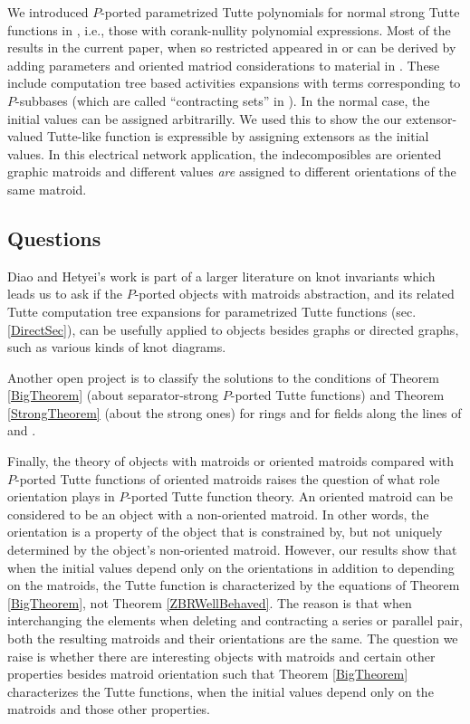\documentclass[12pt,leqno]{amsart}
\theoremstyle{remark}
\begin{document}
We introduced $P$-ported parametrized Tutte polynomials
for normal strong Tutte functions
in \cite{TutteEx}, i.e., 
those with
corank-nullity polynomial expressions.
Most of the results in the current paper, when so restricted
appeared in \cite{TutteEx}
or can be derived by adding parameters and oriented matriod considerations
to material in \cite{sdcPorted}.  
These include computation tree\cite{GordonMcMachonGreedoid} based activities 
expansions 
with terms corresponding to $P$-subbases (which are called
``contracting sets'' in \cite{RelTuttePoly}).
In the normal case, the initial values can be assigned arbitrarilly.
We used this to show the our extensor-valued Tutte-like function 
\cite{sdcPorted} is expressible
by assigning extensors as the initial values.  In this
electrical network application, the indecomposibles are oriented 
graphic matroids
and different values \emph{are} assigned to different orientations of
the same matroid.  

\subsection{Questions}
\label{Qsubsection}
Diao and Hetyei's work \cite{RelTuttePoly} is part of a
larger literature on knot invariants which
leads us to ask if the $P$-ported objects with matroids abstraction, 
and its related Tutte computation tree expansions for parametrized
Tutte functions (sec. \ref{DirectSec}), can be usefully
applied to objects besides graphs or directed graphs, such
as various kinds of knot diagrams.

Another open project is to classify the solutions to
the conditions of Theorem \ref{BigTheorem} (about separator-strong
$P$-ported Tutte functions) and 
Theorem  \ref{StrongTheorem} (about the strong ones) for rings and
for fields along the lines of 
\cite{MR93a:05047} and \cite{BollobasRiordanTuttePolyColored}.

Finally, the theory of objects with matroids or oriented
matroids compared with $P$-ported Tutte functions of 
oriented matroids
raises the question of what role orientation plays in 
$P$-ported Tutte
function theory.  An oriented matroid can be considered to
be an object with a non-oriented matroid.  In other
words, the orientation is a property of the object
that is constrained by, but not uniquely determined by 
the object's non-oriented 
matroid.  However, our results show that when the initial
values
depend only on the orientations in addition
to depending on the matroids, the Tutte function is 
characterized by 
the equations of Theorem \ref{BigTheorem}, not
Theorem \ref{ZBRWellBehaved}.
The reason is that when interchanging the elements
when deleting and contracting a series or parallel pair, 
both the resulting matroids and 
their orientations are the same.  The question we raise
is whether there are interesting objects with matroids
and certain other properties besides matroid orientation
such that Theorem \ref{BigTheorem}
characterizes the Tutte functions, when the initial
values depend only on the matroids and those other properties.
\end{document}
